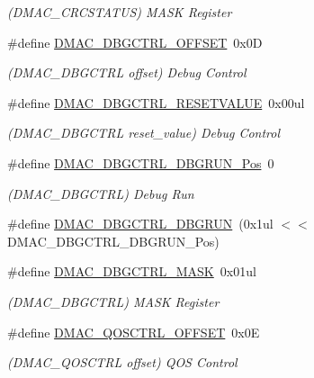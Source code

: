 \begin{DoxyCompactItemize}
\begin{DoxyCompactList}\small\item\em (D\+M\+A\+C\+\_\+\+C\+R\+C\+S\+T\+A\+T\+US) M\+A\+SK Register \end{DoxyCompactList}\item 
\#define \mbox{\hyperlink{group___s_a_m_d21___d_m_a_c_gaa6195ee27516b7db90e1b93d31cf9a23}{D\+M\+A\+C\+\_\+\+D\+B\+G\+C\+T\+R\+L\+\_\+\+O\+F\+F\+S\+ET}}~0x0D
\begin{DoxyCompactList}\small\item\em (D\+M\+A\+C\+\_\+\+D\+B\+G\+C\+T\+RL offset) Debug Control \end{DoxyCompactList}\item 
\#define \mbox{\hyperlink{group___s_a_m_d21___d_m_a_c_ga3b59d85944712c553bac77eedc9706fa}{D\+M\+A\+C\+\_\+\+D\+B\+G\+C\+T\+R\+L\+\_\+\+R\+E\+S\+E\+T\+V\+A\+L\+UE}}~0x00ul
\begin{DoxyCompactList}\small\item\em (D\+M\+A\+C\+\_\+\+D\+B\+G\+C\+T\+RL reset\+\_\+value) Debug Control \end{DoxyCompactList}\item 
\#define \mbox{\hyperlink{group___s_a_m_d21___d_m_a_c_ga8deb5cb9d4ad93002435af93a05f412d}{D\+M\+A\+C\+\_\+\+D\+B\+G\+C\+T\+R\+L\+\_\+\+D\+B\+G\+R\+U\+N\+\_\+\+Pos}}~0
\begin{DoxyCompactList}\small\item\em (D\+M\+A\+C\+\_\+\+D\+B\+G\+C\+T\+RL) Debug Run \end{DoxyCompactList}\item 
\#define \mbox{\hyperlink{group___s_a_m_d21___d_m_a_c_ga82ff63971593b5b403b90676eae6034d}{D\+M\+A\+C\+\_\+\+D\+B\+G\+C\+T\+R\+L\+\_\+\+D\+B\+G\+R\+UN}}~(0x1ul $<$$<$ D\+M\+A\+C\+\_\+\+D\+B\+G\+C\+T\+R\+L\+\_\+\+D\+B\+G\+R\+U\+N\+\_\+\+Pos)
\item 
\#define \mbox{\hyperlink{group___s_a_m_d21___d_m_a_c_ga568ad642de4d4fec94470304cbd0cb04}{D\+M\+A\+C\+\_\+\+D\+B\+G\+C\+T\+R\+L\+\_\+\+M\+A\+SK}}~0x01ul
\begin{DoxyCompactList}\small\item\em (D\+M\+A\+C\+\_\+\+D\+B\+G\+C\+T\+RL) M\+A\+SK Register \end{DoxyCompactList}\item 
\#define \mbox{\hyperlink{group___s_a_m_d21___d_m_a_c_gac18c99dad955fd1986543a99d97d12bc}{D\+M\+A\+C\+\_\+\+Q\+O\+S\+C\+T\+R\+L\+\_\+\+O\+F\+F\+S\+ET}}~0x0E
\begin{DoxyCompactList}\small\item\em (D\+M\+A\+C\+\_\+\+Q\+O\+S\+C\+T\+RL offset) Q\+OS Control \end{DoxyCompactList}\item 
$$
\end{DoxyCompactItemize}

